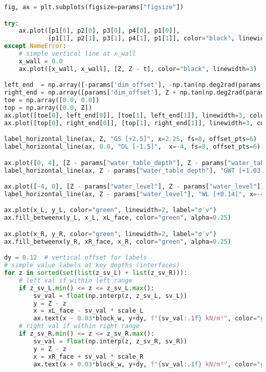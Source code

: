 \begin{lstlisting}[language=Python]
fig, ax = plt.subplots(figsize=params["figsize"])

try:
    ax.plot([p1[0], p2[0], p3[0], p4[0], p1[0]],
            [p1[1], p2[1], p3[1], p4[1], p1[1]], color="black", linewidth=3)
except NameError:
    # simple vertical line at x_wall
    x_wall = 0.0
    ax.plot([x_wall, x_wall], [Z, Z - t], color="black", linewidth=3)

left_end  = np.array([-params['dim_offset'], -np.tan(np.deg2rad(params['beta_left_deg'])) * params['dim_offset']])
right_end = np.array([params['dim_offset'], Z + np.tan(np.deg2rad(params['beta_right_deg'])) * params['dim_offset']])
toe = np.array([0.0, 0.0])
top = np.array([0.0, Z])
ax.plot([toe[0], left_end[0]], [toe[1], left_end[1]], linewidth=3, color="black")
ax.plot([top[0], right_end[0]], [top[1], right_end[1]], linewidth=3, color="black")

label_horizontal_line(ax, Z, "GS [+2.5]", x=2.25, fs=8, offset_pts=6)
label_horizontal_line(ax, 0.0, "DL [-1.5]",  x=-4, fs=8, offset_pts=6)

ax.plot([0, 4], [Z - params["water_table_depth"], Z - params["water_table_depth"]], linestyle="--", linewidth=1.5, color="black")
label_horizontal_line(ax, Z - params["water_table_depth"], "GWT [+1.03]", x=2.25, fs=8, offset_pts=6)

ax.plot([-4, 0], [Z - params["water_level"], Z - params["water_level"]], linestyle="--", linewidth=1.5, color="black")
label_horizontal_line(ax, Z - params["water_level"], "WL [+0.14]", x=-4, fs=8, offset_pts=6)

ax.plot(x_L, y_L, color="green", linewidth=2, label="σ′v")
ax.fill_betweenx(y_L, x_L, xL_face, color="green", alpha=0.25)

ax.plot(x_R, y_R, color="green", linewidth=2, label="σ′v")
ax.fill_betweenx(y_R, xR_face, x_R, color="green", alpha=0.25)

dy = 0.12  # vertical offset for labels
# simple value labels at key depths (interfaces)
for z in sorted(set(list(z_sv_L) + list(z_sv_R))):
    # left val if within left range
    if z_sv_L.min() <= z <= z_sv_L.max():
        sv_val = float(np.interp(z, z_sv_L, sv_L))
        y = Z - z
        x = xL_face - sv_val * scale_L
        ax.text(x - 0.03*block_w, y+dy, f"{sv_val:.1f} kN/m²", color="green", fontsize=8, ha="right", va="center")
    # right val if within right range
    if z_sv_R.min() <= z <= z_sv_R.max():
        sv_val = float(np.interp(z, z_sv_R, sv_R))
        y = Z - z
        x = xR_face + sv_val * scale_R
        ax.text(x + 0.03*block_w, y+dy, f"{sv_val:.1f} kN/m²", color="green", fontsize=8, ha="left", va="center")


\end{lstlisting}
